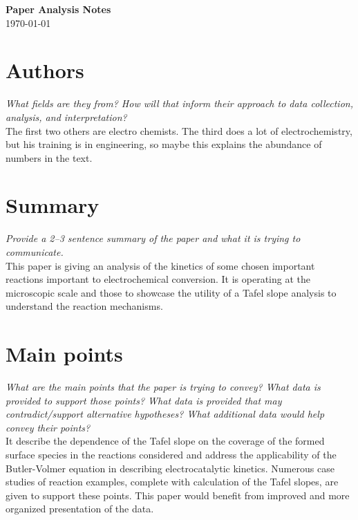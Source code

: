 \documentclass[12pt]{article}
\begin{document}
\begin{center}
    {\LARGE \textbf{Paper Analysis Notes}}\\[6pt]
    \today
\end{center}


\section*{Authors}
\textit{What fields are they from? How will that inform their approach to data collection, analysis, and interpretation?}\\[4pt]
The first two others are electro chemists. The third does a lot of electrochemistry, but his training is in engineering, so maybe this explains the abundance of numbers in the text.

\section*{Summary}
\textit{Provide a 2--3 sentence summary of the paper and what it is trying to communicate.}\\[4pt]
This paper is giving an analysis of the kinetics of some chosen important reactions important to electrochemical conversion. It is operating at the microscopic scale and those to showcase the utility of a Tafel slope analysis to understand the reaction mechanisms.

\section*{Main points}
\textit{What are the main points that the paper is trying to convey? What data is provided to support those points? What data is provided that may contradict/support alternative hypotheses? What additional data would help convey their points?}\\[4pt]
It describe the dependence of the Tafel slope on the coverage of the formed surface species in the reactions considered and address
the applicability of the Butler-Volmer equation in describing electrocatalytic kinetics. Numerous case studies of reaction examples, complete with calculation of the Tafel slopes, are given to support these points. This paper would benefit from improved and more organized presentation of the data.
\end{document}
